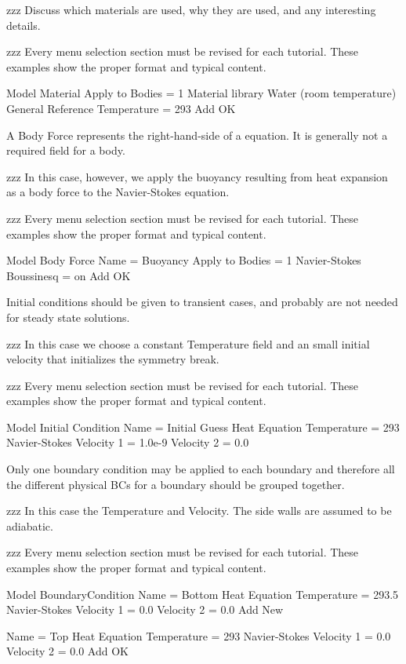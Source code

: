 zzz Discuss which materials are used, why they are used, and any interesting details.
   
zzz Every menu selection section must be revised for each tutorial.  These examples show the proper format and typical content.

\ttbegin
Model
  Material
    Apply to Bodies = 1 
    Material library    
      Water (room temperature)
    General 
      Reference Temperature = 293
    Add
    OK
\ttend

A Body Force represents the right-hand-side of a equation. It is generally not a required field for a body. 

zzz In this case, however, we apply the buoyancy resulting from heat expansion as a body force to the Navier-Stokes equation.

zzz Every menu selection section must be revised for each tutorial.  These examples show the proper format and typical content.

\ttbegin
Model
  Body Force
    Name = Buoyancy
    Apply to Bodies = 1
    Navier-Stokes
      Boussinesq = on
    Add 
    OK
\ttend    

Initial conditions should be given to transient cases, and probably are not needed for steady state solutions. 

zzz In this case we choose a constant Temperature field and an small initial velocity that initializes the symmetry break. 

zzz Every menu selection section must be revised for each tutorial.  These examples show the proper format and typical content.

\ttbegin
Model
  Initial Condition 
    Name = Initial Guess
    Heat Equation
      Temperature = 293
    Navier-Stokes
      Velocity 1 = 1.0e-9
      Velocity 2 = 0.0
\ttend

Only one boundary condition may be applied to each boundary and therefore all the different physical BCs for a boundary should be grouped together. 

zzz In this case the Temperature and Velocity. The side walls are assumed to be adiabatic.

zzz Every menu selection section must be revised for each tutorial.  These examples show the proper format and typical content.

\ttbegin
Model
  BoundaryCondition
    Name = Bottom
    Heat Equation
      Temperature = 293.5
    Navier-Stokes 
      Velocity 1 = 0.0
      Velocity 2 = 0.0
    Add
    New

    Name = Top
    Heat Equation
      Temperature = 293
    Navier-Stokes 
      Velocity 1 = 0.0
      Velocity 2 = 0.0
    Add
   OK 
\ttend   

